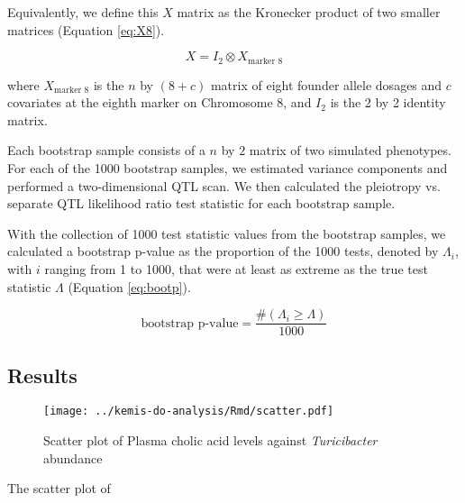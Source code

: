 \documentclass[oneside]{book}
\begin{document}
Equivalently, we define this $X$ matrix as the Kronecker product of two smaller matrices (Equation \ref{eq:X8}). 

\begin{equation}
X = I_2 \otimes X_{\text{marker 8}}
\label{eq:X8}
\end{equation}

where $X_{\text{marker 8}}$ is the $n$ by $(8 + c)$ matrix of eight founder allele dosages and $c$ covariates at the eighth marker on Chromosome 8, and $I_2$ is the 2 by 2 identity matrix.

Each bootstrap sample consists of a $n$ by $2$ matrix of two simulated phenotypes. For each of the 1000 bootstrap samples, we estimated variance components and performed a two-dimensional QTL scan. We then calculated the pleiotropy vs. separate QTL likelihood ratio test statistic for each bootstrap sample.



With the collection of 1000 test statistic values from the bootstrap samples, we calculated a bootstrap p-value as the proportion of the 1000 tests, denoted by $\Lambda_i$, with $i$ ranging from 1 to 1000, that were at least as extreme as the true test statistic $\Lambda$ (Equation \ref{eq:bootp}).

\begin{equation}
\text{bootstrap p-value} = \frac{\#(\Lambda_i \geq \Lambda)}{1000}
\label{eq:bootp}
\end{equation}



\subsection{Results}


\begin{figure}
\texttt{[image: ../kemis-do-analysis/Rmd/scatter.pdf]}
\caption{Scatter plot of Plasma cholic acid levels against \emph{Turicibacter} abundance}
\end{figure}

The scatter plot of 
\end{document}
